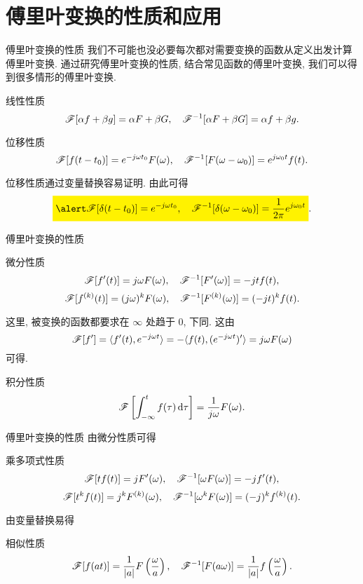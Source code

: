 \section{傅里叶变换的性质和应用}


\begin{frame}{傅里叶变换的性质}
\onslide<+->
我们不可能也没必要每次都对需要变换的函数从定义出发计算傅里叶变换.
\onslide<+->
通过研究傅里叶变换的性质, 结合常见函数的傅里叶变换, 我们可以得到很多情形的傅里叶变换.

\begin{block}{线性性质}
\[\mathscr{F}[\alpha f+\beta g]=\alpha F+\beta G,\quad
\mathscr{F}^{-1}[\alpha F+\beta G]=\alpha f+\beta g.\]
\end{block}
\vspace{-5pt}

\begin{block}{位移性质}
\[\mathscr{F}[f(t-t_0)]=e^{-j\omega t_0}F(\omega),\quad
\mathscr{F}^{-1}[F(\omega-\omega_0)]=e^{j\omega_0 t}f(t).\]
\vspace{-\baselineskip}
\end{block}
\onslide<+->
位移性质通过变量替换容易证明.
\onslide<+->
由此可得
\[\aboxeq{\msf[\delta(t-t_0)]=e^{-j\omega t_0},\quad
\msf^{-1}[\delta(\omega-\omega_0)]=\dfrac1{2\pi}e^{j\omega_0 t}}.\]
\end{frame}


\begin{frame}{傅里叶变换的性质}
\begin{block}{微分性质}
\[\mathscr{F}[f'(t)]=j\omega F(\omega),\quad
\mathscr{F}^{-1}[F'(\omega)]=-jtf(t),\]
\onslide<+->
\vspace{-\baselineskip}
\[\mathscr{F}[f^{(k)}(t)]=(j\omega)^k F(\omega),\quad
\mathscr{F}^{-1}[F^{(k)}(\omega)]=(-jt)^kf(t).\]
\end{block}
\onslide<+->
这里, 被变换的函数都要求在 $\infty$ 处趋于 $0$, 下同. 
\onslide<+->
这由
\[\mathscr{F}[f']=\langle{f'(t),e^{-j\omega t}}\rangle=-\langle{f(t),(e^{-j\omega t})'}\rangle=j\omega F(\omega)\]
可得.

\begin{block}{积分性质}
\[\mathscr{F}\left[\int_{-\infty}^t f(\tau)\,\mathrm{d}\tau\right]=\frac1{j\omega}F(\omega).\]
\end{block}
\end{frame}


\begin{frame}{傅里叶变换的性质}
由微分性质可得
\begin{block}{乘多项式性质}
\[\mathscr{F}[tf(t)]=jF'(\omega),\quad
\mathscr{F}^{-1}[\omega F(\omega)]=-jf'(t),\]
\onslide<+->
\[\mathscr{F}[t^kf(t)]=j^kF^{(k)}(\omega),\quad
\mathscr{F}^{-1}[\omega^kF(\omega)]=(-j)^kf^{(k)}(t).\]
\end{block}
\onslide<+->
由变量替换易得
\begin{block}{相似性质}
\[\mathscr{F}[f(at)]=\frac1{|a|}F\left(\frac\omega a\right),\quad
\mathscr{F}^{-1}[F(a\omega)]=\frac1{|a|}f\left(\frac\omega a\right).\]
\end{block}
\end{frame}


